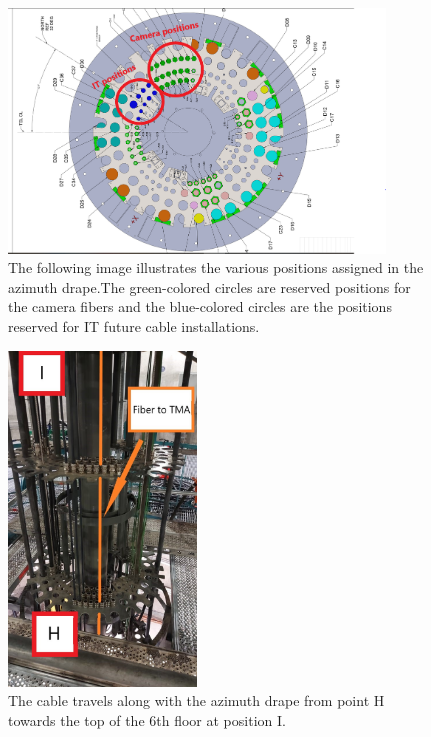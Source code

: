   \begin{figure}
    \centering
    \includegraphics[width=10cm]{images/22.png}
    \caption*{The following image illustrates the various positions assigned in the azimuth drape.The green-colored circles are reserved positions for the camera fibers and the blue-colored circles are the positions reserved for IT future cable installations.}
  \end{figure}
  \begin{figure}
    \centering
    \includegraphics[width=5cm]{images/22-1.jpg}
    \caption*{The cable travels along with the azimuth drape from point H towards the top of the 6th floor at position I.}
  \end{figure}

\newpage

